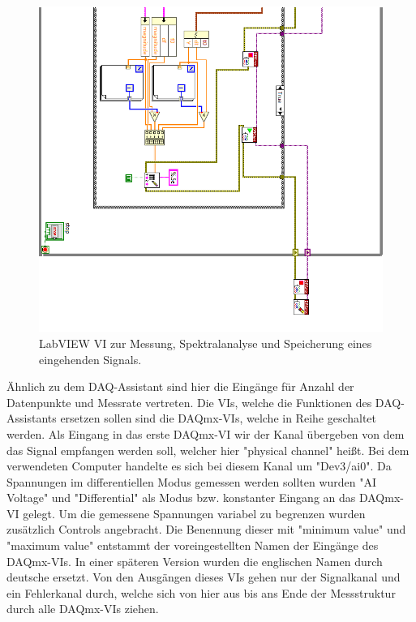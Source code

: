 		\begin{figure}[H]
			\centering
			\includegraphics[width=\textwidth]{pic/messstruktur2.png}	
			\caption{LabVIEW VI zur Messung, Spektralanalyse und Speicherung eines eingehenden Signals.}
			\label{fig:messstruktur}
		\end{figure}
		
		\thispagestyle{empty}
		Ähnlich zu dem DAQ-Assistant sind hier die Eingänge für Anzahl der Datenpunkte und Messrate vertreten.
		Die VIs, welche die Funktionen des DAQ-Assistants ersetzen sollen sind die DAQmx-VIs, welche in Reihe geschaltet werden.
		Als Eingang in das erste DAQmx-VI wir der Kanal übergeben von dem das Signal empfangen werden soll, welcher hier "physical channel" heißt.
		Bei dem verwendeten Computer handelte es sich bei diesem Kanal um "Dev3/ai0".
		Da Spannungen im differentiellen Modus gemessen werden sollten wurden "AI Voltage" und "Differential" als Modus bzw. konstanter Eingang an das DAQmx-VI gelegt. 
		Um die gemessene Spannungen variabel zu begrenzen wurden zusätzlich Controls angebracht.
		Die Benennung dieser mit "minimum value" und "maximum value" entstammt der voreingestellten Namen der Eingänge des DAQmx-VIs.
		In einer späteren Version wurden die englischen Namen durch deutsche ersetzt.
		Von den Ausgängen dieses VIs gehen nur der Signalkanal und ein Fehlerkanal durch, welche sich von hier aus bis ans Ende der Messstruktur durch alle DAQmx-VIs ziehen.
			
